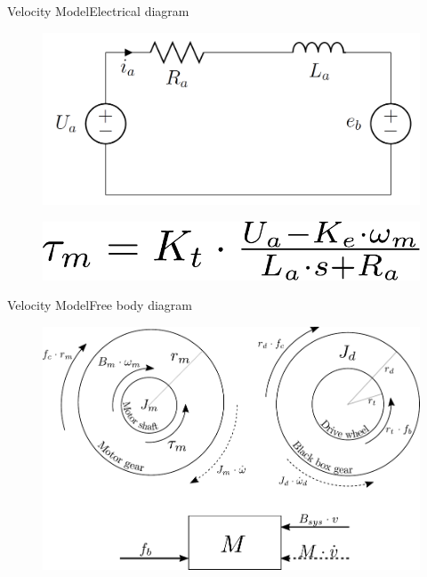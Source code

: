 \begin{frame}{Velocity Model}{Electrical diagram}

\vspace{-10pt}

\begin{figure}[H]
	\centering
	\includegraphics[scale=0.2]{Pictures/ElectricalDiagram.PNG}  
\end{figure}

\begin{figure}[H]
	\centering
	\includegraphics[scale=0.5]{Pictures/ElectricTorqu.pdf}  
\end{figure}

\vspace{20pt}

\end{frame}


\begin{frame}{Velocity Model}{Free body diagram}

\begin{figure}[H]
	\centering
	\includegraphics[scale=0.6]{Pictures/freebodydiagramtogether.pdf}
    
\end{figure}

\end{frame}

